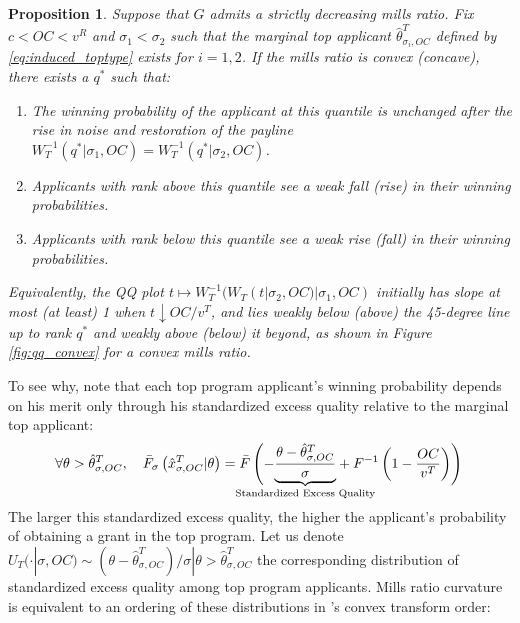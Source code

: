 \documentclass[12pt,reqno]{amsart}
\newtheorem{proposition}{Proposition}
\theoremstyle{definition}
\theoremstyle{plain} %
\begin{document}
\begin{proposition}\label{prop:winner_redistribution}
Suppose that $G$ admits a strictly decreasing mills ratio. Fix $c<OC<v^R$ and $\sigma_1<\sigma_2$ such that the marginal top applicant $\hat{\theta}^T_{\sigma_i,OC}$ defined by \eqref{eq:induced_toptype} exists for $i=1,2$. If the mills ratio is convex (concave), there exists a $q^*$ such that:
\vspace{-5pt}
\begin{enumerate}[label=(\arabic*),ref=\theproposition(\arabic*)]
   \item The winning probability of the applicant at this quantile is unchanged after the rise in noise and restoration of the payline $W_T^{-1}(q^*|\sigma_1,OC) = W_T^{-1}(q^*|\sigma_2,OC)$. 
   \item Applicants with rank \textit{above} this quantile see a weak fall (rise) in their winning probabilities. 
   \item Applicants with rank \textit{below} this quantile see a weak rise (fall) in their winning probabilities. 
\end{enumerate}
Equivalently, the QQ plot $t\mapsto W_T^{-1}(W_T(t|\sigma_2,OC)|\sigma_1,OC)$ initially has slope at most (at least) 1 when $t\downarrow OC/v^T$, and lies weakly below (above) the 45-degree line up to rank $q^*$ and weakly above (below) it beyond, as shown in Figure \ref{fig:qq_convex} for a convex mills ratio.
\end{proposition}




\noindent To see why, note that each top program applicant's winning probability depends on his merit only through his standardized excess quality relative to the marginal top applicant:
\begin{align*}
     \forall \theta > \hat{\theta}^T_{\sigma,OC},\quad \bar{F}_{\sigma}\left(\hat{x}^T_{\sigma,OC}|\theta\right)= \bar{F}\left(-\smash[b]{\underbrace{\dfrac{\theta - \hat{\theta}^T_{\sigma,OC}}{\sigma}}_{\makebox[0pt]{\scriptsize Standardized Excess Quality}}} + F^{-1}\left(1-\dfrac{OC}{v^T}\right)\right)\vphantom{\underbrace{\dfrac{\theta}{\sigma}}_{\text{Standardized}}}
\end{align*}  
The larger this standardized excess quality, the higher the applicant's probability of obtaining a grant in the top program. Let us denote $U_T(\cdot|\sigma,OC) \sim (\theta-\hat{\theta}^T_{\sigma,OC})/\sigma | \theta > \hat{\theta}^T_{\sigma,OC}$ the corresponding distribution of standardized excess quality among top program applicants. Mills ratio curvature is equivalent to an ordering of these distributions in \cite{vanzwet1964convex}'s convex transform order:
\end{document}
